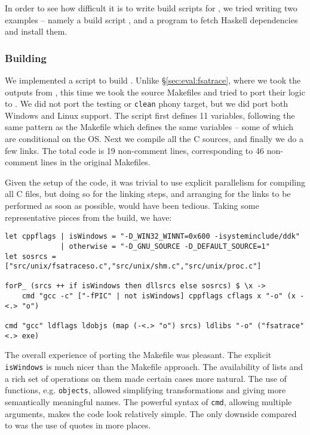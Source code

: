 In order to see how difficult it is to write build scripts for \Rattle, we tried writing two examples -- namely a build script \Fsatrace, and a program to fetch Haskell dependencies and install them.

\subsubsection{Building \Fsatrace}

We implemented a \Rattle script to build \Fsatrace. Unlike \S\ref{sec:eval:fsatrace}, where we took the outputs from \Make, this time we took the source Makefiles and tried to port their logic to \Rattle. We did not port the testing or \texttt{clean} phony target, but we did port both Windows and Linux support. The script first defines 11 variables, following the same pattern as the Makefile which defines the same variables -- some of which are conditional on the OS. Next we compile all the C sources, and finally we do a few links. The total code is 19 non-comment lines, corresponding to 46 non-comment lines in the original Makefiles.

Given the setup of the code, it was trivial to use explicit parallelism for compiling all C files, but doing so for the linking steps, and arranging for the links to be performed as soon as possible, would have been tedious. Taking some representative pieces from the build, we have:

\begin{small}
\begin{verbatim}
let cppflags | isWindows = "-D_WIN32_WINNT=0x600 -isysteminclude/ddk"
             | otherwise = "-D_GNU_SOURCE -D_DEFAULT_SOURCE=1"
let sosrcs = ["src/unix/fsatraceso.c","src/unix/shm.c","src/unix/proc.c"]

forP_ (srcs ++ if isWindows then dllsrcs else sosrcs) $ \x ->
    cmd "gcc -c" ["-fPIC" | not isWindows] cppflags cflags x "-o" (x -<.> "o")

cmd "gcc" ldflags ldobjs (map (-<.> "o") srcs) ldlibs "-o" ("fsatrace" <.> exe)
\end{verbatim}
\end{small}

The overall experience of porting the Makefile was pleasant. The explicit \texttt{isWindows} is much nicer than the Makefile approach. The  availability of lists and a rich set of operations on them made certain cases more natural. The use of functions, e.g. \texttt{objects}, allowed simplifying transformations and giving more semantically meaningful names. The powerful syntax of \texttt{cmd}, allowing multiple arguments, makes the code look relatively simple. The only downside compared to \Make was the use of quotes in more places.

